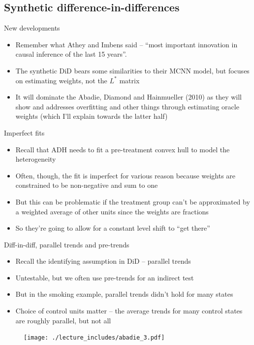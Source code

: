 \documentclass{beamer}
\begin{document}
\subsection{Synthetic difference-in-differences}

\begin{frame}{New developments}

\begin{itemize}
\item Remember what Athey and Imbens said -- ``most important innovation in causal inference of the last 15 years''.
\item The synthetic DiD bears some similarities to their MCNN model, but focuses on estimating weights, not the $L^*$ matrix
\item It will dominate the Abadie, Diamond and Hainmueller (2010) as they will show and addresses overfitting and other things through estimating oracle weights (which I'll explain towards the latter half)
\end{itemize}

\end{frame}





\begin{frame}{Imperfect fits}

\begin{itemize}
\item Recall that ADH needs to fit a pre-treatment convex hull to model the heterogeneity
\item Often, though, the fit is imperfect for various reason because weights are constrained to be non-negative and sum to one
\item But this can be problematic if the treatment group can't be approximated by a weighted average of other units since the weights are fractions 
\item So they're going to allow for a constant level shift to ``get there''
\end{itemize}

\end{frame}



\begin{frame}{Diff-in-diff, parallel trends and pre-trends}

\begin{itemize}
\item Recall the identifying assumption in DiD -- parallel trends
\item Untestable, but we often use pre-trends for an indirect test
\item But in the smoking example, parallel trends didn't hold for many states
\item Choice of control units matter -- the average trends for many control states are roughly parallel, but not all 
\end{itemize}

	
	\begin{figure}
	\texttt{[image: ./lecture\_includes/abadie\_3.pdf]}
	\end{figure}


\end{frame}
\end{document}
